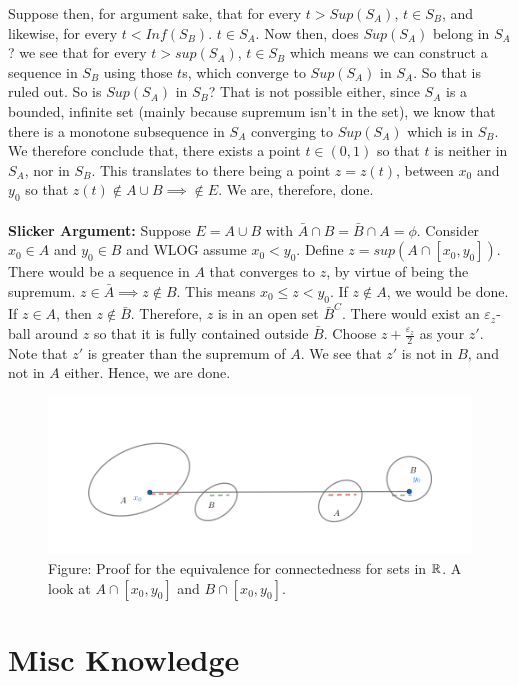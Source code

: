 \documentclass[../Main.tex]{subfiles}
\begin{document}
{Suppose then, for argument sake, that for every $t>Sup(S_A)$, $t\in S_B$, and
likewise, for every $t<Inf(S_B)$. $t \in S_A$. Now then, does $Sup(S_A)$ belong
in $S_A$? we see that for every $t>sup(S_A)$, $t \in S_B$ which means we can construct a sequence in $S_B$ using those $t$s, which converge to $Sup(S_A)$ in $S_A$. So that is ruled out.
So is $Sup(S_A)$ in $S_B$? That is not possible either, since $S_A$ is a bounded, infinite set (mainly because supremum isn't in the set), we know that there is a monotone subsequence in $S_A$ converging to $Sup(S_A)$ which is in $S_B$. We therefore conclude that, there exists a point $t \in (0,1)$ so that $t$ is neither in $S_A$, nor in $S_B$. This translates to there being a point $z=z(t)$, between $x_0$ and $y_0$ so that $z(t)\not\in A \cup B \implies \not\in E$. We are, therefore, done. 
\\\\ \textbf{Slicker Argument:} Suppose $E=A \cup B$ with $\bar{A}\cap B=\bar{B} \cap A=\phi$. Consider $x_0 \in A$ and $y_0 \in B$ and WLOG assume $x_0<y_0$. Define $z=sup(A\cap[x_0,y_0])$.
There would be a sequence in $A$ that converges to $z$, by virtue of being the supremum. $z \in \bar{A} \implies z \not\in B$. This means $x_0 \leq z<y_0$. If $z \not\in A$, we would be done.
If $z \in A$, then $z \not\in \bar{B}$. Therefore, $z$ is in an open set $\bar{B}^C$. There would exist
an $\varepsilon_z$-ball around $z$ so that it is fully contained outside $\bar{B}$. Choose $z+\frac{\varepsilon_z}{2}$ as your $z'$.
Note that $z'$ is greater than the supremum of $A$. We see that $z'$ is not in $B$, and not in $A$ either. Hence, we are done.
}

\begin{figure}[h]
    \centering
    \includegraphics[width=0.5\linewidth]{Images/connectednessprof.png}
    \caption{Figure: Proof for the equivalence for connectedness for sets in $\mathbb R$. A look at $A\cap[x_0,y_0]$ and $B\cap [x_0,y_0]$.}
    \label{fig:contced}
\end{figure}

\section{Misc Knowledge}
\end{document}
